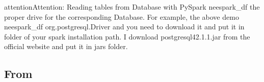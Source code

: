 \documentclass[letterpaper,12pt,english]{sphinxmanual}
\begin{document}
\begin{sphinxVerbatim}[commandchars=\\\{\}]
  
     
    
\end{sphinxVerbatim}

\begin{sphinxadmonition}{attention}{Attention:}
\sphinxAtStartPar
Reading tables from Database with PySpark neespark\_df the proper drive for the corresponding Database. For example, the above demo neespark\_df org.postgresql.Driver and you need to download it and put it in  folder of your spark installation path. I download postgresql\sphinxhyphen{}42.1.1.jar from the official website and put it in jars folder.
\end{sphinxadmonition}


\subsection{From }
\label{\detokenize{pdrdd:from-csv}}
\sphinxAtStartPar
{}
\end{document}
